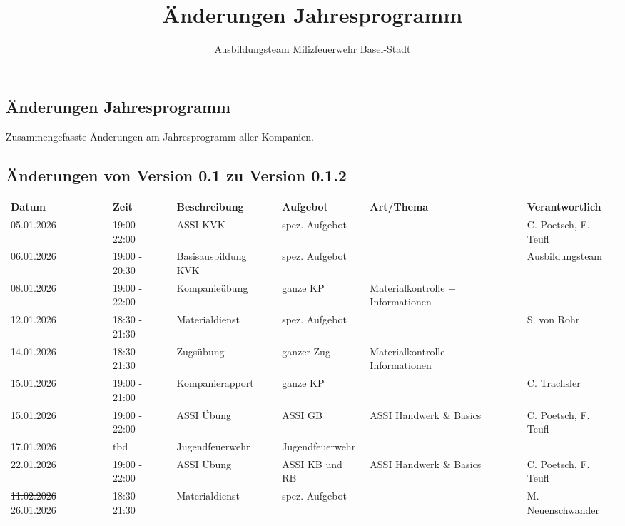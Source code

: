\documentclass[11pt,a4paper]{article}
\title{Änderungen Jahresprogramm}
\author{Ausbildungsteam Milizfeuerwehr Basel-Stadt}
\begin{document}
	\begin{adjustwidth}{1.5cm}{1.5cm}

	\section*{Änderungen Jahresprogramm}
	Zusammengefasste Änderungen am Jahresprogramm aller Kompanien.

    \subsection*{Änderungen von Version 0.1 zu Version 0.1.2}
\tiny
\begin{longtable}{llllll}
	\textbf{Datum} & \textbf{Zeit} & \textbf{Beschreibung} & \textbf{Aufgebot} & \textbf{Art/Thema} & \textbf{Verantwortlich}\\
05.01.2026 & 19:00 - 22:00 & ASSI KVK & spez. Aufgebot & \color{OliveGreen} & \color{OliveGreen}C. Poetsch, F. Teufl \\
06.01.2026 & 19:00 - 20:30 & Basisausbildung KVK & spez. Aufgebot & \color{OliveGreen} & \color{OliveGreen}Ausbildungsteam \\
08.01.2026 & 19:00 - 22:00 & Kompanie\"ubung & ganze KP & \color{OliveGreen}Materialkontrolle + Informationen & \color{OliveGreen} \\
12.01.2026 & 18:30 - 21:30 & Materialdienst & spez. Aufgebot & \color{OliveGreen} & \color{OliveGreen}S. von Rohr \\
14.01.2026 & 18:30 - 21:30 & Zugs\"ubung & ganzer Zug & \color{OliveGreen}Materialkontrolle + Informationen & \color{OliveGreen} \\
\color{OliveGreen}15.01.2026 & \color{OliveGreen}19:00 - 21:00 & \color{OliveGreen}Kompanierapport & \color{OliveGreen}ganze KP & \color{OliveGreen} & \color{OliveGreen}C. Trachsler \\
15.01.2026 & 19:00 - 22:00 & ASSI \"Ubung & ASSI GB & \color{OliveGreen}ASSI Handwerk \& Basics & \color{OliveGreen}C. Poetsch, F. Teufl \\
\color{OliveGreen}17.01.2026 & \color{OliveGreen}tbd & \color{OliveGreen}Jugendfeuerwehr & \color{OliveGreen}Jugendfeuerwehr & \color{OliveGreen} & \color{OliveGreen} \\
22.01.2026 & 19:00 - 22:00 & ASSI \"Ubung & ASSI KB und RB & \color{OliveGreen}ASSI Handwerk \& Basics & \color{OliveGreen}C. Poetsch, F. Teufl \\
\color{BrickRed}\sout{11.02.2026} \color{OliveGreen}26.01.2026 & 18:30 - 21:30 & Materialdienst & spez. Aufgebot & \color{OliveGreen} & \color{OliveGreen}M. Neuenschwander \\

\end{longtable}
\end{adjustwidth}
\end{document}
